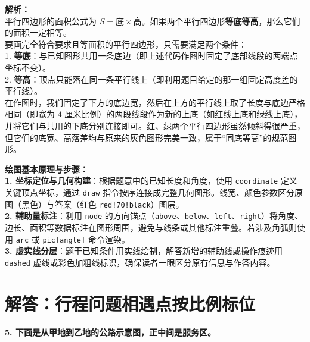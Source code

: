 \documentclass[12pt, a4paper]{ctexrep}
\begin{document}
\vspace{0.6cm}
{\small\color{gray}
\textbf{解析：}\\
平行四边形的面积公式为 $S = \text{底} \times \text{高}$。如果两个平行四边形\textbf{等底等高}，那么它们的面积一定相等。\\
要画完全符合要求且等面积的平行四边形，只需要满足两个条件：\\
1. \textbf{等底}：与已知图形共用一条底边（即上述代码作图时固定了底部线段的两端点坐标不变）。\\
2. \textbf{等高}：顶点只能落在同一条平行线上（即利用题目给定的那一组固定高度差的平行线）。\\
在作图时，我们固定了下方的底边宽，然后在上方的平行线上取了长度与底边严格相同（即宽为 $4$ 厘米比例）的两段线段作为新的上底（如红线上底和绿线上底），并将它们与共用的下底分别连接即可。红、绿两个平行四边形虽然倾斜得很严重，但它们的底宽、高落差均与原来的灰色图形完美一致，属于“同底等高”的规范图形。
}


\vspace{0.6cm}

{\small\color{blue!70!black}
\textbf{绘图基本原理与步骤：}\\
\textbf{1. 坐标定位与几何构建}：根据题意中的已知长度和角度，使用 \texttt{coordinate} 定义关键顶点坐标，通过 \texttt{draw} 指令按序连接成完整几何图形。线宽、颜色参数区分原图（黑色）与答案（红色 \texttt{red!70!black}）图层。\\
\textbf{2. 辅助量标注}：利用 \texttt{node} 的方向锚点（\texttt{above}、\texttt{below}、\texttt{left}、\texttt{right}）将角度、边长、面积等数据标注在图形周围，避免与线条或其他标注重叠。若涉及角弧则使用 \texttt{arc} 或 \texttt{pic[angle]} 命令渲染。\\
\textbf{3. 虚实线分层}：题干已知条件用实线绘制，解答新增的辅助线或操作痕迹用 \texttt{dashed} 虚线或彩色加粗线标识，确保读者一眼区分原有信息与作答内容。
}

\newpage

\section{解答：行程问题相遇点按比例标位}

\vspace{0.4cm}

\noindent\textbf{5. 下面是从甲地到乙地的公路示意图，正中间是服务区。}
\end{document}
